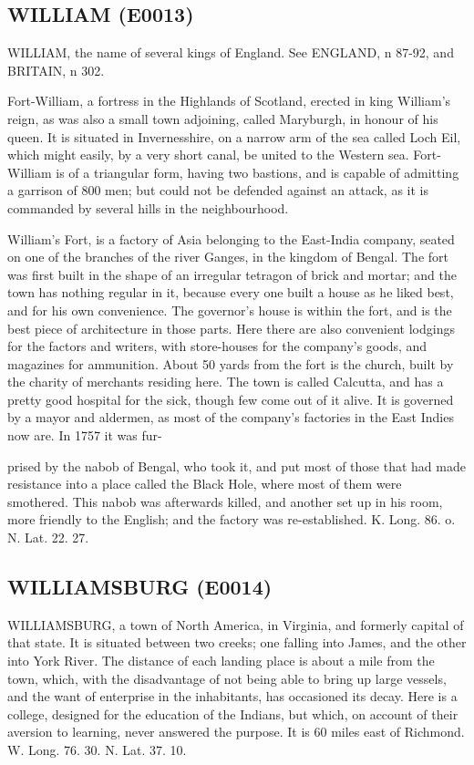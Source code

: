 \documentclass{article}
\begin{document}
\subsection*{WILLIAM (E0013)}
WILLIAM, the name of several kings of England. See ENGLAND, n 87-92, and BRITAIN, n 302.

Fort-William, a fortress in the Highlands of Scotland, erected in king William's reign, as was also a small town adjoining, called Maryburgh, in honour of his queen. It is situated in Invernesshire, on a narrow arm of the sea called Loch Eil, which might easily, by a very short canal, be united to the Western sea. Fort-William is of a triangular form, having two bastions, and is capable of admitting a garrison of 800 men; but could not be defended against an attack, as it is commanded by several hills in the neighbourhood.

William's Fort, is a factory of Asia belonging to the East-India company, seated on one of the branches of the river Ganges, in the kingdom of Bengal. The fort was first built in the shape of an irregular tetragon of brick and mortar; and the town has nothing regular in it, because every one built a house as he liked best, and for his own convenience. The governor's house is within the fort, and is the best piece of architecture in those parts. Here there are also convenient lodgings for the factors and writers, with store-houses for the company's goods, and magazines for ammunition. About 50 yards from the fort is the church, built by the charity of merchants residing here. The town is called Calcutta, and has a pretty good hospital for the sick, though few come out of it alive. It is governed by a mayor and aldermen, as most of the company's factories in the East Indies now are. In 1757 it was fur-

prised by the nabob of Bengal, who took it, and put most of those that had made resistance into a place called the Black Hole, where most of them were smothered. This nabob was afterwards killed, and another set up in his room, more friendly to the English; and the factory was re-established. K. Long. 86. o. N. Lat. 22. 27.

\subsection*{WILLIAMSBURG (E0014)}
WILLIAMSBURG, a town of North America, in Virginia, and formerly capital of that state. It is situated between two creeks; one falling into James, and the other into York River. The distance of each landing place is about a mile from the town, which, with the disadvantage of not being able to bring up large vessels, and the want of enterprise in the inhabitants, has occasioned its decay. Here is a college, designed for the education of the Indians, but which, on account of their aversion to learning, never answered the purpose. It is 60 miles east of Richmond. W. Long. 76. 30. N. Lat. 37. 10.
\end{document}
